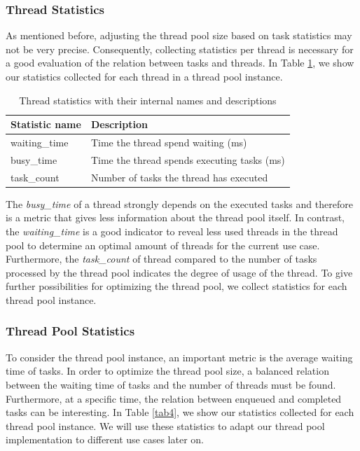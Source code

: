 \documentclass[conference]{IEEEtran}
\begin{document}
\subsubsection{Thread Statistics}
As mentioned before, adjusting the thread pool size based on task statistics may not be very precise. Consequently, collecting statistics per thread is necessary for a good evaluation of the relation between tasks and threads. In Table \ref{tab3}, we show our statistics collected for each thread in a thread pool instance.

\begin{table}[htbp]
	\caption{Thread statistics with their internal names and descriptions}
	\begin{center}
		\begin{tabular}{ l l }
			\hline
			\textbf{Statistic name}&\textbf{Description}\\
			\hline
			waiting\_time & Time the thread spend waiting (ms) \\
			busy\_time & Time the thread spends executing tasks (ms)\\
			task\_count & Number of tasks the thread has executed \\
			\hline
		\end{tabular}
		\label{tab3}
	\end{center}
\end{table}

The \emph{busy\_time} of a thread strongly depends on the executed tasks and therefore is a metric that gives less information about the thread pool itself. In contrast, the \emph{waiting\_time} is a good indicator to reveal less used threads in the thread pool to determine an optimal amount of threads for the current use case. Furthermore, the \emph{task\_count} of thread compared to the number of tasks processed by the thread pool indicates the degree of usage of the thread. To give further possibilities for optimizing the thread pool, we collect statistics for each thread pool instance.

\subsubsection{Thread Pool Statistics}
To consider the thread pool instance, an important metric is the average waiting time of tasks. In order to optimize the thread pool size, a balanced relation between the waiting time of tasks and the number of threads must be found. Furthermore, at a specific time, the relation between enqueued and completed tasks can be interesting. In Table \ref{tab4}, we show our statistics collected for each thread pool instance. We will use these statistics to adapt our thread pool implementation to different use cases later on.
\end{document}
